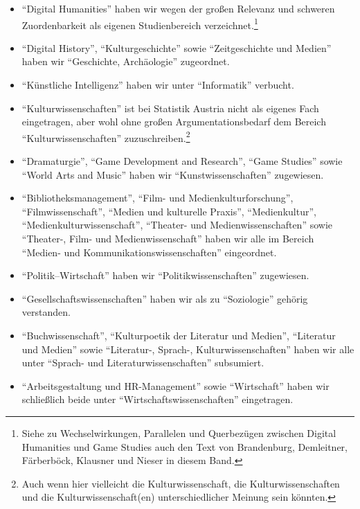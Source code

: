 \documentclass{scrartcl}
\begin{document}
\begin{itemize}
   \item \enquote{Digital Humanities} haben wir wegen der großen Relevanz und schweren Zuordenbarkeit als eigenen Studienbereich verzeichnet.\footnote{Siehe zu Wechselwirkungen, Parallelen und Querbezügen zwischen Digital Humanities und Game Studies auch den Text von Brandenburg, Demleitner, Färberböck, Klausner und Nieser in diesem Band.}
   \item \enquote{Digital History}, \enquote{Kulturgeschichte} sowie \enquote{Zeitgeschichte und Medien} haben wir \enquote{Geschichte, Archäologie} zugeordnet.
   \item \enquote{Künstliche Intelligenz} haben wir unter \enquote{Informatik} verbucht.
   \item \enquote{Kulturwissenschaften} ist bei Statistik Austria nicht als eigenes Fach eingetragen, aber wohl ohne großen Argumentationsbedarf dem Bereich \enquote{Kulturwissenschaften} zuzuschreiben.\footnote{Auch wenn hier vielleicht die Kulturwissenschaft, die Kulturwissenschaften und die Kulturwissenschaft(en) unterschiedlicher Meinung sein könnten.}
   \item \enquote{Dramaturgie}, \enquote{Game Development and Research}, \enquote{Game Studies} sowie \enquote{World Arts and Music} haben wir \enquote{Kunstwissenschaften} zugewiesen.
   \item \enquote{Bibliotheksmanagement}, \enquote{Film- und Medienkulturforschung}, \enquote{Filmwissenschaft}, \enquote{Medien und kulturelle Praxis}, \enquote{Medienkultur}, \enquote{Medienkulturwissen\-schaft}, \enquote{Thea\-ter- und Medienwissenschaften} sowie \enquote{Theater-, Film- und Medienwissenschaft} haben wir alle im Bereich \enquote{Medien- und Kommunikationswissenschaften} eingeordnet.
   \item \enquote{Politik–Wirtschaft} haben wir \enquote{Politikwissenschaften} zugewiesen.
   \item \enquote{Gesellschaftswissenschaften} haben wir als zu \enquote{Soziologie} gehörig verstanden.
   \item \enquote{Buchwissenschaft}, \enquote{Kulturpoetik der Literatur und Medien}, \enquote{Literatur und Medien} sowie \enquote{Literatur-, Sprach-, Kulturwissenschaften} haben wir alle unter \enquote{Sprach- und Literaturwissenschaften} subsumiert.
   \item \enquote{Arbeitsgestaltung und HR-Management} sowie \enquote{Wirtschaft} haben wir schließlich beide unter \enquote{Wirtschaftswissenschaften} eingetragen.
\end{itemize}
\end{document}
